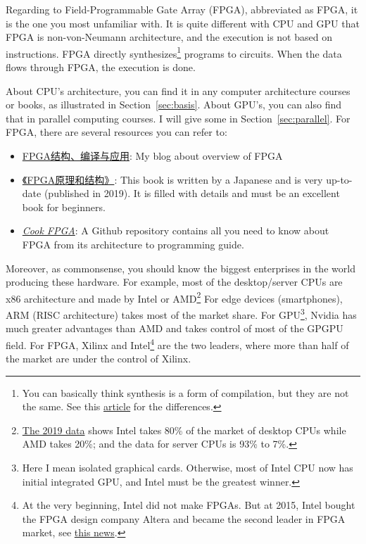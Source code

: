 \documentclass[english]{../TexTemplate/thesis}
\begin{document}
Regarding to Field-Programmable Gate Array (FPGA), abbreviated as FPGA, it is the one you most unfamiliar with. It is quite different with CPU and GPU that FPGA is non-von-Neumann architecture, and the execution is not based on instructions. FPGA directly synthesizes\footnote{You can basically think synthesis is a form of compilation, but they are not the same. See this \href{https://chhzh123.github.io/blogs/2020-02-01-compilation-and-synthesis/}{article} for the differences.} programs to circuits. When the data flows through FPGA, the execution is done.

About CPU's architecture, you can find it in any computer architecture courses or books, as illustrated in Section~\ref{sec:basis}.
About GPU's, you can also find that in parallel computing courses. I will give some in Section~\ref{sec:parallel}.
For FPGA, there are several resources you can refer to:
\begin{itemize}
	\item \href{https://chhzh123.github.io/blogs/2019-02-08-fpga-all/}{FPGA结构、编译与应用}: My blog about overview of FPGA
	\item \href{https://book.douban.com/subject/33390084/}{《FPGA原理和结构》}: This book is written by a Japanese and is very up-to-date (published in 2019). It is filled with details and must be an excellent book for beginners.
	\item \href{https://github.com/lastweek/FPGA}{\emph{Cook FPGA}}: A Github repository contains all you need to know about FPGA from its architecture to programming guide.
\end{itemize}

Moreover, as commonsense, you should know the biggest enterprises in the world producing these hardware. For example, most of the desktop/server CPUs are x86 architecture and made by Intel or AMD\footnote{\href{https://finance.yahoo.com/news/intel-vs-amd-reviewing-rivalry-160718187.html?guccounter=1&guce_referrer=aHR0cHM6Ly93d3cuZ29vZ2xlLmNvbS5oay8&guce_referrer_sig=AQAAAGutCYIthRsbiqrf0MLfuMwLJA7l1xYdyACmXtbsdiNet95zyZ4npC-cDxrxJVx0AlnVlgS64_3_sKcZb4alqe1Igip5SK3ES7DoSBq61I0IrRVFXGpoRKO4uJO4uEa-v_lH4uGZWagZUqgNL5i6MZvx60vC8rWdSqvyCA9HmEHa}{The 2019 data} shows Intel takes 80\% of the market of desktop CPUs while AMD takes 20\%; and the data for server CPUs is 93\% to 7\%.}
For edge devices (smartphones), ARM (RISC architecture) takes most of the market share.
For GPU\footnote{Here I mean isolated graphical cards. Otherwise, most of Intel CPU now has initial integrated GPU, and Intel must be the greatest winner.}, Nvidia has much greater advantages than AMD and takes control of most of the GPGPU field.
For FPGA, Xilinx and Intel\footnote{At the very beginning, Intel did not make FPGAs. But at 2015, Intel bought the FPGA design company Altera and became the second leader in FPGA market, see \href{https://www.fool.com/investing/general/2015/06/05/why-is-intel-corporation-paying-167-billion-for-al.aspx}{this news}.} are the two leaders, where more than half of the market are under the control of Xilinx.
\end{document}

